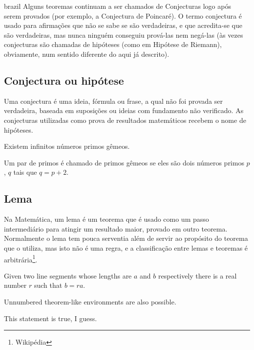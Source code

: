 \begin{otherlanguage*}{brazil}
Alguns teoremas continuam a ser chamados de Conjecturas logo após serem provados (por exemplo, a Conjectura de Poincaré). O termo conjectura é usado para afirmações que não se sabe se são verdadeiras, e que acredita-se que são verdadeiras, mas nunca ninguém conseguiu prová-las nem negá-las (às vezes conjecturas são chamadas de hipóteses (como em Hipótese de Riemann), obviamente, num sentido diferente do aqui já descrito).


\subsection{Conjectura ou hipótese}

Uma conjectura é uma ideia, fórmula ou frase, a qual não foi provada ser verdadeira, baseada em suposições ou ideias com fundamento não verificado. As conjecturas utilizadas como prova de resultados matemáticos recebem o nome de hipóteses.



\begin{conjectura}
Existem infinitos números primos gêmeos.
\end{conjectura}

Um par de primos é chamado de primos gêmeos se eles são dois números primos $p$, $q$ tais que $q = p + 2$.



\subsection{Lema}

    Na Matemática, um lema é um teorema que é usado como um passo intermediário para atingir um resultado maior, provado em outro teorema. Normalmente o lema tem pouca serventia além de servir ao propósito do teorema que o utiliza, mas isto não é uma regra, e a classificação entre lemas e teoremas é arbitrária\footnote{Wikipédia}.


\begin{lema}
    Given two line segments whose lengths are $a$ and $b$ respectively there is a
    real number $r$ such that $b=ra$.
\end{lema}



Unnumbered theorem-like environments are also possible.

\begin{observacao}
    This statement is true, I guess.
\end{observacao}


\end{otherlanguage*}
